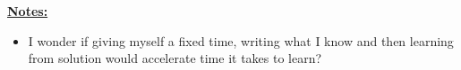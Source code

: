 \documentclass[12pt]{article}
\begin{document}
\begin{enumerate}[a.]
    \bigskip

    \underline{\textbf{Notes:}}

    \bigskip

    \begin{itemize}
        \item I wonder if giving myself a fixed time, writing what I know
        and then learning from solution would accelerate time it takes to learn?
    \end{itemize}

















\end{enumerate}
\end{document}

